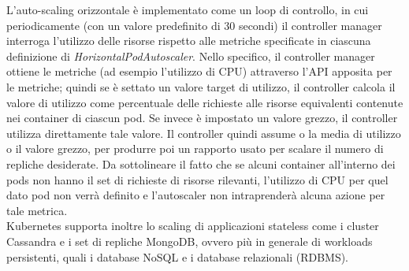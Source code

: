 \documentclass[12pt, a4paper]{report}
\begin{document}
L'auto-scaling orizzontale è implementato come un loop di controllo, in cui periodicamente (con un valore predefinito di 30 secondi) il controller manager interroga l'utilizzo delle risorse rispetto alle metriche specificate in ciascuna definizione di \textit{HorizontalPodAutoscaler}.
Nello specifico, il controller manager ottiene le metriche (ad esempio l'utilizzo di CPU) attraverso l'API apposita per le metriche; quindi se è settato un valore target di utilizzo, il controller calcola il valore di utilizzo come percentuale delle richieste alle risorse equivalenti contenute nei container di ciascun pod. Se invece è impostato un valore grezzo, il controller utilizza direttamente tale valore. Il controller quindi assume o la media di utilizzo o il valore grezzo, per produrre poi un rapporto usato per scalare il numero di repliche desiderate. Da sottolineare il fatto che se alcuni container all'interno dei pods non hanno il set di richieste di risorse rilevanti, l'utilizzo di CPU per quel dato pod non verrà definito e l'autoscaler non intraprenderà alcuna azione per tale metrica.\\
Kubernetes supporta inoltre lo scaling di applicazioni stateless come i cluster Cassandra e i set di repliche MongoDB, ovvero più in generale di workloads persistenti, quali i database NoSQL e i database relazionali (RDBMS).
\end{document}
